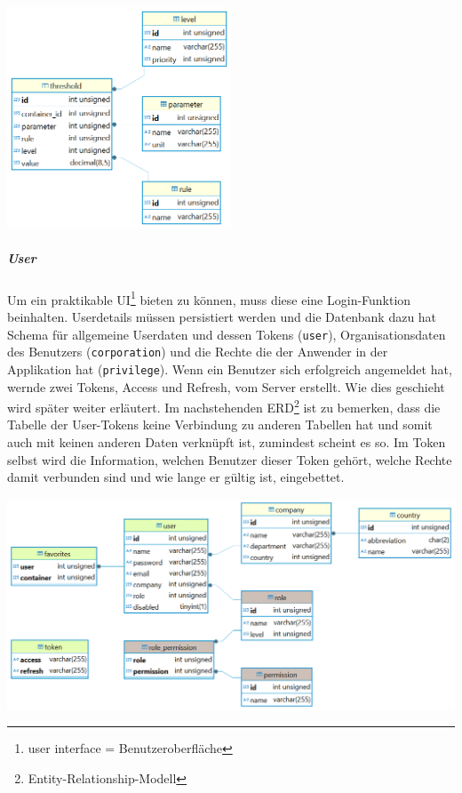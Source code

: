 \documentclass[
    headings=optiontotocandhead,%
    twoside,
    numbers=noenddot,%
    12pt, %
    titlepage, %
    parskip=full, %
    listof=leveldown, 
    numbers=noenddot, %
    a4paper,DIV=14,
    BCOR=15mm,
]{scrbook}
\newcommand{\passthrough}[1]{#1}
\let\origfigure=\figure
\let\endorigfigure=\endfigure
\renewenvironment{figure}[1][]{%
   \origfigure[H]
}{%
   \endorigfigure
}
\begin{document}
\begin{figure}
\centering
\includegraphics[width=0.5\textwidth,height=\textheight]{img/Schrempf/threshold-erd.png}
\caption{ERD der Grenzwertdatenbank}
\end{figure}

\hypertarget{user}{%
\subparagraph{User}\label{user}}

Um ein praktikable UI\footnote{user interface = Benutzeroberfläche}
bieten zu können, muss diese eine Login-Funktion beinhalten. Userdetails
müssen persistiert werden und die Datenbank dazu hat Schema für
allgemeine Userdaten und dessen Tokens (\passthrough{\lstinline!user!}),
Organisationsdaten des Benutzers (\passthrough{\lstinline!corporation!})
und die Rechte die der Anwender in der Applikation hat
(\passthrough{\lstinline!privilege!}). Wenn ein Benutzer sich
erfolgreich angemeldet hat, wernde zwei Tokens, Access und Refresh, vom
Server erstellt. Wie dies geschieht wird später weiter erläutert. Im
nachstehenden ERD\footnote{Entity-Relationship-Modell} ist zu bemerken,
dass die Tabelle der User-Tokens keine Verbindung zu anderen Tabellen
hat und somit auch mit keinen anderen Daten verknüpft ist, zumindest
scheint es so. Im Token selbst wird die Information, welchen Benutzer
dieser Token gehört, welche Rechte damit verbunden sind und wie lange er
gültig ist, eingebettet.

\begin{figure}
\centering
\includegraphics[width=1\textwidth,height=\textheight]{img/Schrempf/user-erd.png}
\caption{ERD der Benutzerdatenbank}
\end{figure}
\end{document}
